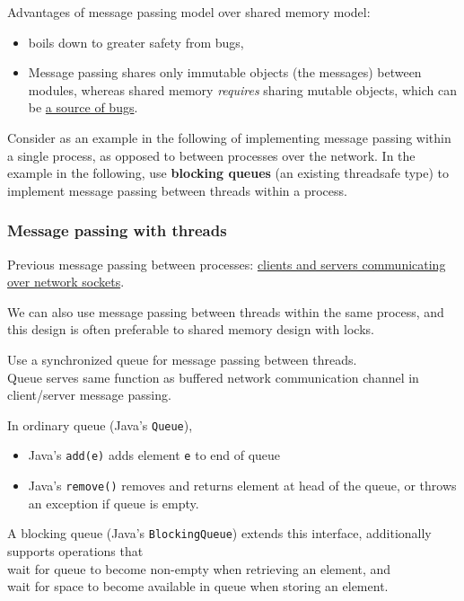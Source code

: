 \documentclass[10pt]{amsart}
\begin{document}
Advantages of message passing model over shared memory model:
\begin{itemize}
	\item boils down to greater safety from bugs,
	\item Message passing shares only immutable objects (the messages) between modules, whereas shared memory \emph{requires} sharing mutable objects, which can be \href{http://web.mit.edu/6.031/www/sp20/classes/08-immutability/#risks_of_mutation}{a source of bugs}.
\end{itemize}

Consider as an example in the following of implementing message passing within a single process, as opposed to between processes over the network. In the example in the following, use \textbf{blocking queues} (an existing threadsafe type) to implement message passing between threads within a process.

\subsubsection{Message passing with threads}

Previous message passing between processes: \href{http://web.mit.edu/6.005/www/fa15/classes/21-sockets-networking/#network_sockets}{clients and servers communicating over network sockets}. 

We can also use message passing between threads within the same process, and this design is often preferable to shared memory design with locks.

Use a synchronized queue for message passing between threads. \\
Queue serves same function as buffered network communication channel in client/server message passing.

In ordinary queue (Java's \texttt{Queue}), \\
\begin{itemize}
	\item Java's \texttt{add(e)} adds element \texttt{e} to end of queue
	\item Java's \texttt{remove()} removes and returns element at head of the queue, or throws an exception if queue is empty.
\end{itemize}

A blocking queue (Java's \verb|BlockingQueue|) extends this interface, additionally supports operations that \\
wait for queue to become non-empty when retrieving an element, and \\
wait for space to become available in queue when storing an element. \\
\end{document}
